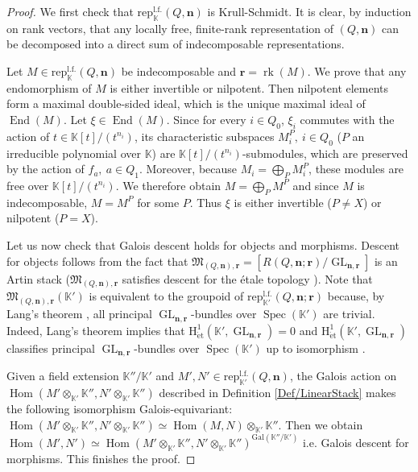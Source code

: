 \documentclass[11pt,english]{article}
\numberwithin{equation}{section}
\numberwithin{figure}{section}
\theoremstyle{definition}
\theoremstyle{plain}
\theoremstyle{remark}
\DeclareMathOperator{\End}{End}
\DeclareMathOperator{\Hom}{Hom}
\DeclareMathOperator{\GL}{GL}
\DeclareMathOperator{\rk}{rk}
\DeclareMathOperator{\Spec}{Spec}
\newcommand\nn{\mathbf{n}}
\newcommand\rr{\mathbf{r}}
\newcommand\KK{\mathbb{K}}
\begin{document}
\begin{proof}

We first check that $\mathrm{rep}_{\KK}^{\mathrm{l.f.}}(Q,\nn)$ is
Krull-Schmidt. It is clear, by induction on rank vectors, that any
locally free, finite-rank representation of $(Q,\nn)$ can be decomposed
into a direct sum of indecomposable representations.

Let $M\in\mathrm{rep}_{\KK}^{\mathrm{l.f.}}(Q,\nn)$ be indecomposable
and $\rr=\rk(M)$. We prove that any endomorphism of $M$ is either
invertible or nilpotent. Then nilpotent elements form a maximal double-sided
ideal, which is the unique maximal ideal of $\End(M)$. Let $\xi\in\End(M)$.
Since for every $i\in Q_{0}$, $\xi_{i}$ commutes with the action
of $t\in\KK[t]/(t^{n_{i}})$, its characteristic subspaces $M_{i}^{P},\ i\in Q_{0}$
($P$ an irreducible polynomial over $\KK$) are $\KK[t]/(t^{n_{i}})$-submodules,
which are preserved by the action of $f_{a},\ a\in Q_{1}$. Moreover,
because $M_{i}=\bigoplus_{P}M_{i}^{P}$, these modules are free over
$\KK[t]/(t^{n_{i}})$. We therefore obtain $M=\bigoplus_{P}M^{P}$
and since $M$ is indecomposable, $M=M^{P}$ for some $P$. Thus $\xi$
is either invertible ($P\ne X$) or nilpotent ($P=X$).

Let us now check that Galois descent holds for objects and morphisms.
Descent for objects follows from the fact that $\mathfrak{M}_{(Q,\nn),\rr}=\left[R(Q,\nn;\rr)/\GL_{\nn,\rr}\right]$
is an Artin stack ($\mathfrak{M}_{(Q,\nn),\rr}$ satisfies descent
for the étale topology \cite[Exmp. 8.1.12.]{Ols16}). Note that $\mathfrak{M}_{(Q,\nn),\rr}(\KK')$
is equivalent to the groupoid of $\mathrm{rep}_{\KK'}^{\mathrm{l.f.}}(Q,\nn;\rr)$
because, by Lang's theorem \cite[Thm. 4.4.17.]{Spr98}, all principal
$\GL_{\nn,\rr}$-bundles over $\Spec(\KK')$ are trivial. Indeed,
Lang's theorem implies that $\mathrm{H}_{\mathrm{\acute{e}t}}^{1}(\KK',\GL_{\nn,\rr})=0$
and $\mathrm{H}_{\mathrm{\acute{e}t}}^{1}(\KK',\GL_{\nn,\rr})$ classifies
principal $\GL_{\nn,\rr}$-bundles over $\Spec(\KK')$ up to isomorphism
\cite[Cor. 12.1.5.]{Ols16}.

Given a field extension $\KK''/\KK'$ and $M',N'\in\mathrm{rep}_{\KK'}^{\mathrm{l.f.}}(Q,\nn)$,
the Galois action on $\Hom(M'\otimes_{\KK'}\KK'',N'\otimes_{\KK'}\KK'')$
described in Definition \ref{Def/LinearStack} makes the following
isomorphism Galois-equivariant: $\Hom(M'\otimes_{\KK'}\KK'',N'\otimes_{\KK'}\KK'')\simeq\Hom(M,N)\otimes_{\KK'}\KK''$.
Then we obtain $\Hom(M',N')\simeq\Hom(M'\otimes_{\KK'}\KK'',N'\otimes_{\KK'}\KK'')^{\mathrm{Gal}(\KK''/\KK')}$
i.e. Galois descent for morphisms. This finishes the proof. \end{proof}
\end{document}
